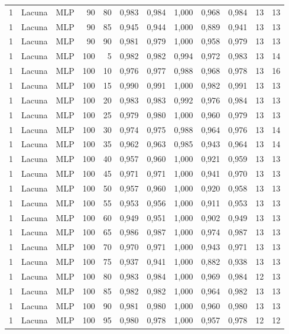 \begin{longtable}{@{}rllrrrrrrrrr@{}}
1 & Lacuna & MLP & 90 & 80 & 0,983 & 0,984 & 1,000 & 0,968 & 0,984 & 13 & 13 \\
1 & Lacuna & MLP & 90 & 85 & 0,945 & 0,944 & 1,000 & 0,889 & 0,941 & 13 & 13 \\
1 & Lacuna & MLP & 90 & 90 & 0,981 & 0,979 & 1,000 & 0,958 & 0,979 & 13 & 13 \\
1 & Lacuna & MLP & 100 & 5 & 0,982 & 0,982 & 0,994 & 0,972 & 0,983 & 13 & 14 \\
1 & Lacuna & MLP & 100 & 10 & 0,976 & 0,977 & 0,988 & 0,968 & 0,978 & 13 & 16 \\
1 & Lacuna & MLP & 100 & 15 & 0,990 & 0,991 & 1,000 & 0,982 & 0,991 & 13 & 13 \\
1 & Lacuna & MLP & 100 & 20 & 0,983 & 0,983 & 0,992 & 0,976 & 0,984 & 13 & 13 \\
1 & Lacuna & MLP & 100 & 25 & 0,979 & 0,980 & 1,000 & 0,960 & 0,979 & 13 & 13 \\
1 & Lacuna & MLP & 100 & 30 & 0,974 & 0,975 & 0,988 & 0,964 & 0,976 & 13 & 14 \\
1 & Lacuna & MLP & 100 & 35 & 0,962 & 0,963 & 0,985 & 0,943 & 0,964 & 13 & 14 \\
1 & Lacuna & MLP & 100 & 40 & 0,957 & 0,960 & 1,000 & 0,921 & 0,959 & 13 & 13 \\
1 & Lacuna & MLP & 100 & 45 & 0,971 & 0,971 & 1,000 & 0,941 & 0,970 & 13 & 13 \\
1 & Lacuna & MLP & 100 & 50 & 0,957 & 0,960 & 1,000 & 0,920 & 0,958 & 13 & 13 \\
1 & Lacuna & MLP & 100 & 55 & 0,953 & 0,956 & 1,000 & 0,911 & 0,953 & 13 & 13 \\
1 & Lacuna & MLP & 100 & 60 & 0,949 & 0,951 & 1,000 & 0,902 & 0,949 & 13 & 13 \\
1 & Lacuna & MLP & 100 & 65 & 0,986 & 0,987 & 1,000 & 0,974 & 0,987 & 13 & 13 \\
1 & Lacuna & MLP & 100 & 70 & 0,970 & 0,971 & 1,000 & 0,943 & 0,971 & 13 & 13 \\
1 & Lacuna & MLP & 100 & 75 & 0,937 & 0,941 & 1,000 & 0,882 & 0,938 & 13 & 13 \\
1 & Lacuna & MLP & 100 & 80 & 0,983 & 0,984 & 1,000 & 0,969 & 0,984 & 12 & 13 \\
1 & Lacuna & MLP & 100 & 85 & 0,982 & 0,982 & 1,000 & 0,964 & 0,982 & 13 & 13 \\
1 & Lacuna & MLP & 100 & 90 & 0,981 & 0,980 & 1,000 & 0,960 & 0,980 & 13 & 13 \\
1 & Lacuna & MLP & 100 & 95 & 0,980 & 0,978 & 1,000 & 0,957 & 0,978 & 12 & 12 \\

\end{longtable}

